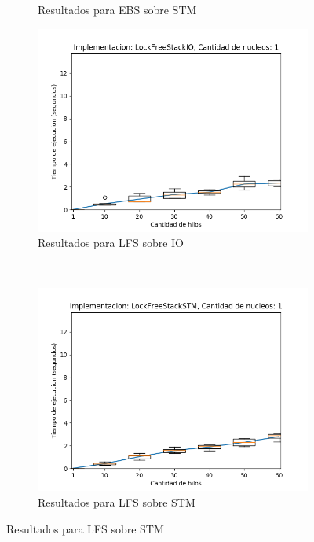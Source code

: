 \begin{appendices}
\begin{figure}[H]
\begin{subfigure}[b]{0.49\textwidth}
        \caption{Resultados para EBS sobre STM}
        \label{subfig:numberOfThreads-ebsstm-1}
    \end{subfigure}
    \begin{subfigure}[b]{0.49\textwidth}
        \includegraphics[width=\textwidth]{images/numberOfThreads/plots/expLFSIO-1}
        \caption{Resultados para LFS sobre IO}
        \label{subfig:numberOfThreads-lfsio-1}
    \end{subfigure}
    ~
    \begin{subfigure}[b]{0.49\textwidth}
        \includegraphics[width=\textwidth]{images/numberOfThreads/plots/expLFSSTM-1}
        \caption{Resultados para LFS sobre STM}
        \label{subfig:numberOfThreads-lfsstm-1}

\end{subfigure}
\end{figure}
\end{appendices}
